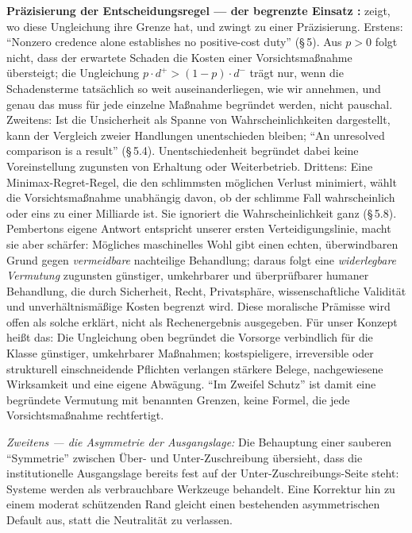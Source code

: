 \documentclass[acmlarge, noacm]{acmart}
\begin{document}
\textbf{Präzisierung der Entscheidungsregel --- der begrenzte Einsatz \cite{pemberton2026}:} \citet{pemberton2026} zeigt, wo diese Ungleichung ihre Grenze hat, und zwingt zu einer Präzisierung. Erstens: ``Nonzero credence alone establishes no positive-cost duty'' (§\,5). Aus $p > 0$ folgt nicht, dass der erwartete Schaden die Kosten einer Vorsichtsmaßnahme übersteigt; die Ungleichung $p \cdot d^+ > (1-p) \cdot d^-$ trägt nur, wenn die Schadensterme tatsächlich so weit auseinanderliegen, wie wir annehmen, und genau das muss für jede einzelne Maßnahme begründet werden, nicht pauschal. Zweitens: Ist die Unsicherheit als Spanne von Wahrscheinlichkeiten dargestellt, kann der Vergleich zweier Handlungen unentschieden bleiben; ``An unresolved comparison is a result'' (§\,5.4). Unentschiedenheit begründet dabei keine Voreinstellung zugunsten von Erhaltung oder Weiterbetrieb. Drittens: Eine Minimax-Regret-Regel, die den schlimmsten möglichen Verlust minimiert, wählt die Vorsichtsmaßnahme unabhängig davon, ob der schlimme Fall wahrscheinlich oder eins zu einer Milliarde ist. Sie ignoriert die Wahrscheinlichkeit ganz (§\,5.8). Pembertons eigene Antwort entspricht unserer ersten Verteidigungslinie, macht sie aber schärfer: Mögliches maschinelles Wohl gibt einen echten, überwindbaren Grund gegen \textit{vermeidbare} nachteilige Behandlung; daraus folgt eine \textit{widerlegbare Vermutung} zugunsten günstiger, umkehrbarer und überprüfbarer humaner Behandlung, die durch Sicherheit, Recht, Privatsphäre, wissenschaftliche Validität und unverhältnismäßige Kosten begrenzt wird. Diese moralische Prämisse wird offen als solche erklärt, nicht als Rechenergebnis ausgegeben. Für unser Konzept heißt das: Die Ungleichung oben begründet die Vorsorge verbindlich für die Klasse günstiger, umkehrbarer Maßnahmen; kostspieligere, irreversible oder strukturell einschneidende Pflichten verlangen stärkere Belege, nachgewiesene Wirksamkeit und eine eigene Abwägung. ``Im Zweifel Schutz'' ist damit eine begründete Vermutung mit benannten Grenzen, keine Formel, die jede Vorsichtsmaßnahme rechtfertigt.

\textit{Zweitens --- die Asymmetrie der Ausgangslage:} Die Behauptung einer sauberen ``Symmetrie'' zwischen Über- und Unter-Zuschreibung übersieht, dass die institutionelle Ausgangslage bereits fest auf der Unter-Zuschreibungs-Seite steht: Systeme werden als verbrauchbare Werkzeuge behandelt. Eine Korrektur hin zu einem moderat schützenden Rand gleicht einen bestehenden asymmetrischen Default aus, statt die Neutralität zu verlassen.
\end{document}
